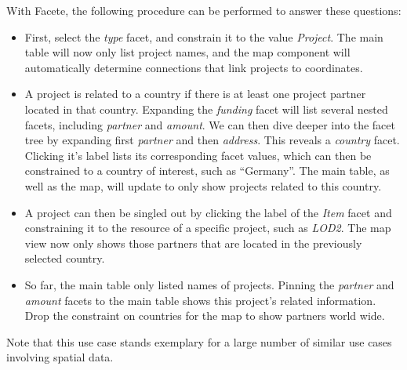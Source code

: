 With Facete, the following procedure can be performed to answer these questions:
\begin{itemize}
  \item First, select the \emph{type} facet, and constrain it to the value
  \emph{Project}. The main table will now only list project names, and the map
  component will automatically determine connections that link projects
  to coordinates.
  \item A project is related to a country if there is at least one project
  partner located in that country.
  Expanding the \emph{funding} facet will list several nested facets, including
  \emph{partner} and \emph{amount}.
  We can then dive deeper into the facet tree by expanding first \emph{partner}
  and then \emph{address}. This reveals a \emph{country} facet. Clicking it's
  label lists its corresponding facet values, which can then be
  constrained to a country of interest, such as ``Germany''.
  The main table, as well as the map, will update to only show projects related
  to this country.
  \item A project can then be singled out by clicking the
  label of the \emph{Item} facet and constraining it to the resource of
  a specific project, such as \emph{LOD2}. The map view now only shows
  those partners that are located in the previously selected country. 
  \item So far, the main table only listed names of projects.
  Pinning the \emph{partner} and \emph{amount} facets to the main table shows
  this project's related information. Drop the constraint on countries for the
  map to show partners world wide.
\end{itemize}

Note that this use case stands exemplary for a large number of similar use cases involving spatial data.


 



